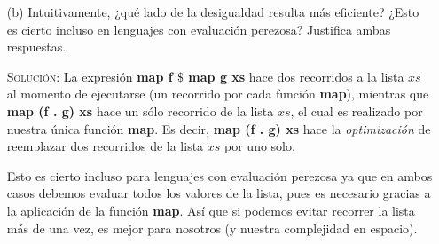 \documentclass[letterpaper,11pt]{article}
\begin{document}
\begin{enumerate}
\begin{itemize}
        \item[(b)] Intuitivamente, ¿qué lado de la desigualdad resulta más 
        eficiente? ¿Esto es cierto incluso en lenguajes con evaluación perezosa? 
        Justifica ambas respuestas.

        \textsc{Solución:} La expresión \textbf{map f $\$$ map g xs} hace dos 
        recorridos a la lista $xs$ al momento de ejecutarse (un recorrido 
        por cada función \textbf{map}), mientras que \textbf{map (f . g) xs}
        hace un sólo recorrido de la lista $xs$, el cual es realizado por 
        nuestra única función \textbf{map}. Es decir, \textbf{map (f . g) xs}
        hace la \textit{optimización} de reemplazar dos recorridos de la lista 
        $xs$ por uno solo.

        Esto es cierto incluso para lenguajes con evaluación perezosa ya que 
        en ambos casos debemos evaluar todos los valores de la lista, pues 
        es necesario gracias a la aplicación de la función \textbf{map}. 
        Así que si podemos evitar recorrer la lista más de una vez, es 
        mejor para nosotros (y nuestra complejidad en espacio).
    \end{itemize}
\end{enumerate}
\end{document}
